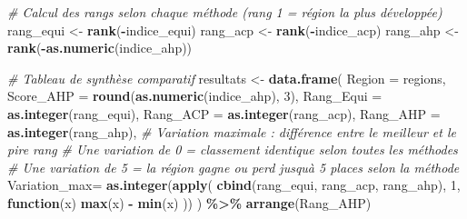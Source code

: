 \documentclass[
]{article}
\newenvironment{Shaded}{\begin{snugshade}}{\end{snugshade}}
\newcommand{\AttributeTok}[1]{\textcolor[rgb]{0.13,0.29,0.53}{#1}}
\newcommand{\CommentTok}[1]{\textcolor[rgb]{0.56,0.35,0.01}{\textit{#1}}}
\newcommand{\ControlFlowTok}[1]{\textcolor[rgb]{0.13,0.29,0.53}{\textbf{#1}}}
\newcommand{\DecValTok}[1]{\textcolor[rgb]{0.00,0.00,0.81}{#1}}
\newcommand{\FunctionTok}[1]{\textcolor[rgb]{0.13,0.29,0.53}{\textbf{#1}}}
\newcommand{\NormalTok}[1]{#1}
\newcommand{\OtherTok}[1]{\textcolor[rgb]{0.56,0.35,0.01}{#1}}
\newcommand{\SpecialCharTok}[1]{\textcolor[rgb]{0.81,0.36,0.00}{\textbf{#1}}}
\begin{document}
\begin{Shaded}
\begin{Highlighting}[]
\CommentTok{\# Calcul des rangs selon chaque méthode (rang 1 = région la plus développée)}
\NormalTok{rang\_equi }\OtherTok{\textless{}{-}} \FunctionTok{rank}\NormalTok{(}\SpecialCharTok{{-}}\NormalTok{indice\_equi)}
\NormalTok{rang\_acp  }\OtherTok{\textless{}{-}} \FunctionTok{rank}\NormalTok{(}\SpecialCharTok{{-}}\NormalTok{indice\_acp)}
\NormalTok{rang\_ahp  }\OtherTok{\textless{}{-}} \FunctionTok{rank}\NormalTok{(}\SpecialCharTok{{-}}\FunctionTok{as.numeric}\NormalTok{(indice\_ahp))}

\CommentTok{\# Tableau de synthèse comparatif}
\NormalTok{resultats }\OtherTok{\textless{}{-}} \FunctionTok{data.frame}\NormalTok{(}
  \AttributeTok{Region       =}\NormalTok{ regions,}
  \AttributeTok{Score\_AHP    =} \FunctionTok{round}\NormalTok{(}\FunctionTok{as.numeric}\NormalTok{(indice\_ahp), }\DecValTok{3}\NormalTok{),}
  \AttributeTok{Rang\_Equi    =} \FunctionTok{as.integer}\NormalTok{(rang\_equi),}
  \AttributeTok{Rang\_ACP     =} \FunctionTok{as.integer}\NormalTok{(rang\_acp),}
  \AttributeTok{Rang\_AHP     =} \FunctionTok{as.integer}\NormalTok{(rang\_ahp),}
  \CommentTok{\# Variation maximale : différence entre le meilleur et le pire rang}
  \CommentTok{\# Une variation de 0 = classement identique selon toutes les méthodes}
  \CommentTok{\# Une variation de 5 = la région gagne ou perd jusqu\textquotesingle{}à 5 places selon la méthode}
  \AttributeTok{Variation\_max=} \FunctionTok{as.integer}\NormalTok{(}\FunctionTok{apply}\NormalTok{(}
    \FunctionTok{cbind}\NormalTok{(rang\_equi, rang\_acp, rang\_ahp), }\DecValTok{1}\NormalTok{, }\ControlFlowTok{function}\NormalTok{(x) }\FunctionTok{max}\NormalTok{(x) }\SpecialCharTok{{-}} \FunctionTok{min}\NormalTok{(x)}
\NormalTok{  ))}
\NormalTok{) }\SpecialCharTok{\%\textgreater{}\%} \FunctionTok{arrange}\NormalTok{(Rang\_AHP)}


\end{Highlighting}
\end{Shaded}
\end{document}
